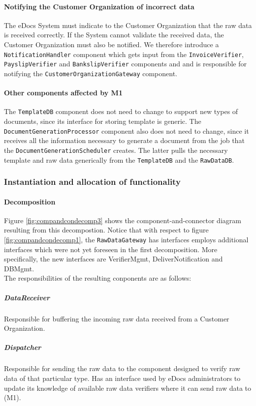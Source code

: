 \documentclass[a4paper,10pt]{article}
\begin{document}
\paragraph{Notifying the Customer Organization of incorrect data}
The eDocs System must indicate to the Customer Organization that the raw data is received correctly. If the System cannot validate the received data, the Customer Organization must also be notified. We therefore introduce a \texttt{NotificationHandler} component which gets input from the \texttt{InvoiceVerifier}, \texttt{PayslipVerifier} and \texttt{BankslipVerifier} components and and is responsible for notifying the \texttt{CustomerOrganizationGateway} component.

\paragraph{Other components affected by M1}
The \texttt{TemplateDB} component does not need to change to support new types of documents, since its interface for storing template is generic. The \texttt{DocumentGenerationProcessor} component also does not need to change, since it receives all the information necessary to generate a document from the job that the \texttt{DocumentGenerationScheduler} creates. The latter pulls the necessary template and raw data generically from the \texttt{TemplateDB} and the \texttt{RawDataDB}.
\subsubsection{Instantiation and allocation of functionality}
\paragraph{Decomposition}
Figure \ref{fig:compandcondecomp3} shows the component-and-connector diagram resulting from this decompostion. Notice that with respect to figure  \ref{fig:compandcondecomp1}, the \texttt{RawDataGateway} has interfaces employs additional interfaces which were not yet foreseen in the first decomposition. More specifically, the new interfaces are VerifierMgmt, DeliverNotification and DBMgmt.\\
The responsibilities of the resulting conponents are as follows:
\subparagraph{DataReceiver} Responsible for buffering the incoming raw data received from a Customer Organization.

\subparagraph{Dispatcher} Responsible for sending the raw data to the component designed to verify raw data of that particular type. Has an interface used by eDocs administrators to update its knowledge of available raw data verifiers where it can send raw data to (M1).
\end{document}
